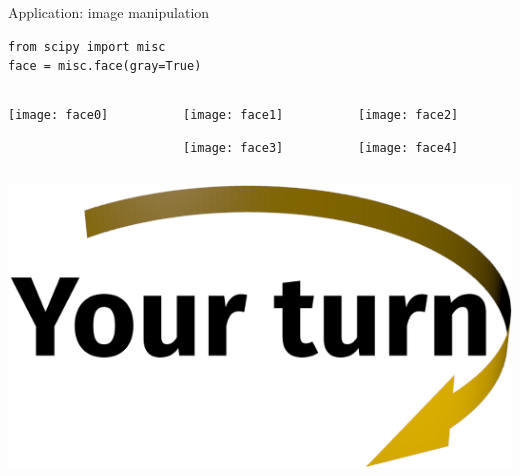 \documentclass[svgnames]{beamer}
\begin{document}
\begin{frame}[fragile]{Application: image manipulation}

 \begin{lstlisting}
from scipy import misc
face = misc.face(gray=True)
 \end{lstlisting}

 \vspace{-0.2truecm}
 \begin{columns}
  \begin{column}{0.33\textwidth}
   \begin{center}
    \texttt{[image: face0]}
    
    \vspace{2.4truecm}
   \end{center}
  \end{column}%
  \begin{column}{0.33\textwidth}
   \begin{center}
    \texttt{[image: face1]}

    \texttt{[image: face3]}
   \end{center}
  \end{column}%
  \begin{column}{0.33\textwidth}
   \begin{center}
    \texttt{[image: face2]}

    \texttt{[image: face4]}
   \end{center}
  \end{column}%
 \end{columns}

 \vspace{0.2truecm}
 \begin{center}
  \includegraphics[width=3truecm]{yourturn}
 \end{center}
\end{frame}
\end{document}
